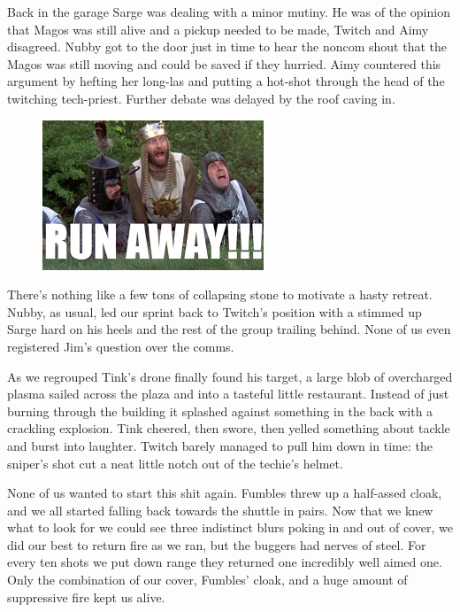 Back in the garage Sarge was dealing with a minor mutiny. 
He was of the opinion that Magos was still alive and a pickup needed to be made, Twitch and Aimy disagreed. 
Nubby got to the door just in time to hear the noncom shout that the Magos was still moving and could be saved if they hurried. 
Aimy countered this argument by hefting her long-las and putting a hot-shot through the head of the twitching tech-priest. 
Further debate was delayed by the roof caving in.
\begin{figure}
	\begin{center}
		\includegraphics[width=\figwidth]{pics/11/26.png}
	\end{center}
\end{figure}
There's nothing like a few tons of collapsing stone to motivate a hasty retreat. 
Nubby, as usual, led our sprint back to Twitch's position with a stimmed up Sarge hard on his heels and the rest of the group trailing behind. 
None of us even registered Jim's question over the comms.

As we regrouped Tink's drone finally found his target, a large blob of overcharged plasma sailed across the plaza and into a tasteful little restaurant. 
Instead of just burning through the building it splashed against something in the back with a crackling explosion. 
Tink cheered, then swore, then yelled something about tackle and burst into laughter. 
Twitch barely managed to pull him down in time: 
the sniper's shot cut a neat little notch out of the techie's helmet.

None of us wanted to start this shit again. 
Fumbles threw up a half-assed cloak, and we all started falling back towards the shuttle in pairs. 
Now that we knew what to look for we could see three indistinct blurs poking in and out of cover, we did our best to return fire as we ran, but the buggers had nerves of steel. 
For every ten shots we put down range they returned one incredibly well aimed one. 
Only the combination of our cover, Fumbles' cloak, and a huge amount of suppressive fire kept us alive.

